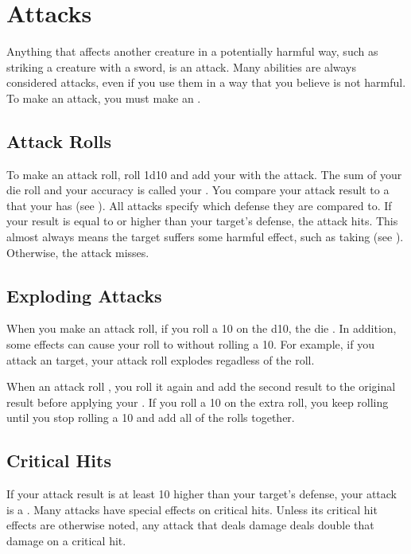 \section{Attacks}
    Anything that affects another creature in a potentially harmful way, such as striking a creature with a sword, is an attack.
    Many abilities are always considered attacks, even if you use them in a way that you believe is not harmful.
    To make an attack, you must make an .

    \subsection{Attack Rolls}

        To make an attack roll, roll 1d10 and add your  with the attack.
        The sum of your die roll and your accuracy is called your .
        You compare your attack result to a  that your  has (see ).
        All attacks specify which defense they are compared to.
        If your result is equal to or higher than your target's defense, the attack hits.
        This almost always means the target suffers some harmful effect, such as taking  (see ).
        Otherwise, the attack misses.

    \subsection{Exploding Attacks}\label{Exploding Attacks}
        When you make an attack roll, if you roll a 10 on the d10, the die .
        In addition, some effects can cause your roll to  without rolling a 10.
        For example, if you attack an  target, your attack roll explodes regadless of the roll.

        When an attack roll , you roll it again and add the second result to the original result before applying your .
        If you roll a 10 on the extra roll, you keep rolling until you stop rolling a 10 and add all of the rolls together.

    \subsection{Critical Hits}\label{Critical Hits}
        If your attack result is at least 10 higher than your target's defense, your attack is a .
        Many attacks have special effects on critical hits.
        Unless its critical hit effects are otherwise noted, any attack that deals damage deals double that damage on a critical hit.


